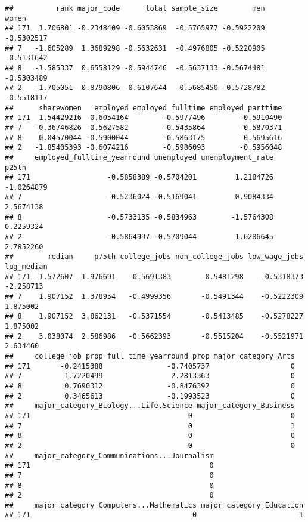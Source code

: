 \documentclass[
]{article}
\begin{document}
\begin{verbatim}
##          rank major_code      total sample_size        men      women
## 171  1.706801 -0.2348409 -0.6053869  -0.5765977 -0.5922209 -0.5302517
## 7   -1.605289  1.3689298 -0.5632631  -0.4976805 -0.5220905 -0.5131642
## 8   -1.585337  0.6558129 -0.5944746  -0.5637133 -0.5674481 -0.5303489
## 2   -1.705051 -0.8790806 -0.6107644  -0.5685450 -0.5728782 -0.5518117
##      sharewomen   employed employed_fulltime employed_parttime
## 171  1.54429216 -0.6054164        -0.5977496        -0.5910490
## 7   -0.36746826 -0.5627582        -0.5435864        -0.5870371
## 8    0.04570044 -0.5900044        -0.5863175        -0.5695616
## 2   -1.85405393 -0.6074216        -0.5986093        -0.5956048
##     employed_fulltime_yearround unemployed unemployment_rate      p25th
## 171                  -0.5858389 -0.5704201         1.2184726 -1.0264879
## 7                    -0.5236024 -0.5169041         0.9084334  2.5674138
## 8                    -0.5733135 -0.5834963        -1.5764308  0.2259324
## 2                    -0.5864997 -0.5709044         1.6286645  2.7852260
##        median     p75th college_jobs non_college_jobs low_wage_jobs log_median
## 171 -1.572607 -1.976691   -0.5691383       -0.5481298    -0.5318373  -2.258713
## 7    1.907152  1.378954   -0.4999356       -0.5491344    -0.5222309   1.875002
## 8    1.907152  3.862131   -0.5371554       -0.5413485    -0.5278227   1.875002
## 2    3.038074  2.586986   -0.5662393       -0.5515204    -0.5521971   2.634460
##     college_job_prop full_time_yearround_prop major_category_Arts
## 171       -0.2415388               -0.7405737                   0
## 7          1.7220499                2.2813363                   0
## 8          0.7690312               -0.8476392                   0
## 2          0.3465613               -0.1993523                   0
##     major_category_Biology...Life.Science major_category_Business
## 171                                     0                       0
## 7                                       0                       1
## 8                                       0                       0
## 2                                       0                       0
##     major_category_Communications...Journalism
## 171                                          0
## 7                                            0
## 8                                            0
## 2                                            0
##     major_category_Computers...Mathematics major_category_Education
## 171                                      0                        1

\end{verbatim}
\end{document}
